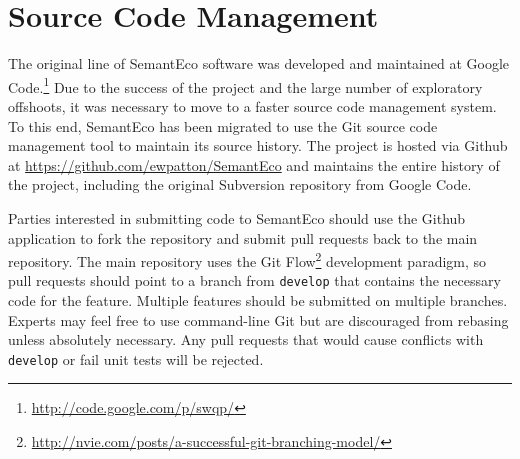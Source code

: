 \documentclass[letterpaper]{report}
\begin{document}
\chapter{Source Code Management}
The original line of SemantEco software was developed and maintained at Google Code.\footnote{\url{http://code.google.com/p/swqp/}} Due to the success of the project and the large number of exploratory offshoots, it was necessary to move to a faster source code management system. To this end, SemantEco has been migrated to use the Git source code management tool to maintain its source history. The project is hosted via Github at \url{https://github.com/ewpatton/SemantEco} and maintains the entire history of the project, including the original Subversion repository from Google Code.

Parties interested in submitting code to SemantEco should use the Github application to fork the repository and submit pull requests back to the main repository. The main repository uses the Git Flow\footnote{\url{http://nvie.com/posts/a-successful-git-branching-model/}} development paradigm, so pull requests should point to a branch from \texttt{develop} that contains the necessary code for the feature. Multiple features should be submitted on multiple branches. Experts may feel free to use command-line Git but are discouraged from rebasing unless absolutely necessary. Any pull requests that would cause conflicts with \texttt{develop} or fail unit tests will be rejected.

\renewcommand{\bibname}{References}


\end{document}
